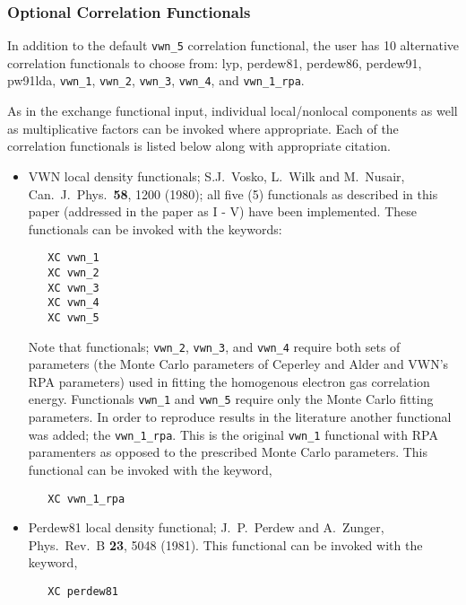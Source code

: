   
\subsubsection{Optional Correlation Functionals}

In addition to the default \verb+vwn_5+ correlation functional, the user has
10 alternative correlation functionals to choose from: lyp, perdew81,
perdew86, perdew91, pw91lda, \verb+vwn_1+, \verb+vwn_2+, \verb+vwn_3+,
\verb+vwn_4+, and \verb+vwn_1_rpa+.

As in the exchange functional input, individual local/nonlocal
components as well as multiplicative factors can be invoked where
appropriate.  Each of the correlation functionals is listed below along with
appropriate citation. 

\begin{itemize}
\item VWN local density functionals; S.J.~Vosko, L.~Wilk and M.~Nusair, 
  Can.~J.~Phys.~{\bf  58}, 1200 (1980); all five (5) functionals as
  described in this paper (addressed in the paper as I - V) have been
  implemented.  These functionals can be invoked with the keywords:
\begin{verbatim}
   XC vwn_1
   XC vwn_2
   XC vwn_3
   XC vwn_4
   XC vwn_5
\end{verbatim}

Note that functionals; \verb+vwn_2+, \verb+vwn_3+, and \verb+vwn_4+ require both sets of 
parameters (the Monte Carlo parameters of Ceperley and Alder and
VWN's RPA parameters) used in fitting the homogenous electron gas
correlation energy.  Functionals \verb+vwn_1+ and \verb+vwn_5+ require only the
Monte Carlo fitting parameters.  In order to reproduce results in the
literature another functional was added; the \verb+vwn_1_rpa+.  This is the
original \verb+vwn_1+ functional with RPA paramenters as opposed to the
prescribed Monte Carlo parameters.  This functional can be invoked
with the keyword,

\begin{verbatim}
   XC vwn_1_rpa
\end{verbatim}

\item Perdew81 local density functional; J.~P.~Perdew and A.~Zunger,
  Phys.~Rev.~B {\bf23}, 5048 (1981). This functional can be invoked with the
  keyword,
  
\begin{verbatim}
   XC perdew81
\end{verbatim}


\end{itemize}
